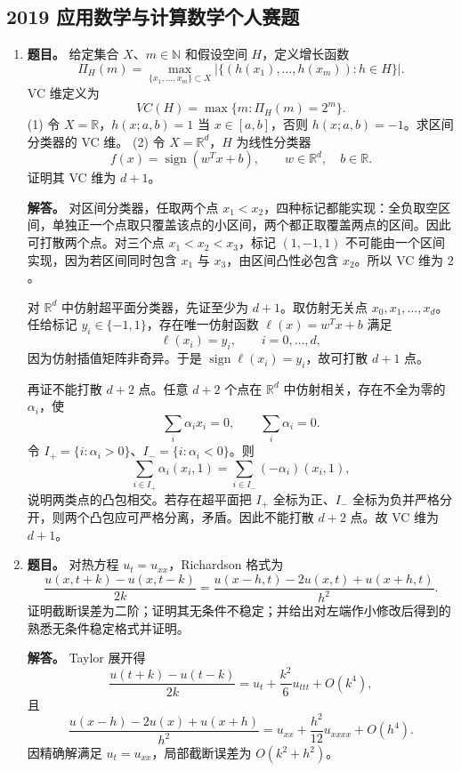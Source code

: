 ﻿\documentclass[UTF8,12pt]{ctexart}
\begin{document}
\subsection{2019 应用数学与计算数学个人赛题}
\begin{enumerate}[label=\textbf{\arabic*.},leftmargin=2.2em]
\item \textbf{题目。} 给定集合 \(X\)、\(m\in\mathbb N\) 和假设空间 \(H\)，定义增长函数
\[
\Pi_H(m)=\max_{\{x_1,
\ldots,x_m\}\subset X}
\left|\{(h(x_1),\ldots,h(x_m)):h\in H\}\right|.
\]
VC 维定义为
\[
VC(H)=\max\{m:\Pi_H(m)=2^m\}.
\]
(1) 令 \(X=\mathbb R\)，\(h(x;a,b)=1\) 当 \(x\in[a,b]\)，否则 \(h(x;a,b)=-1\)。求区间分类器的 VC 维。
(2) 令 \(X=\mathbb R^d\)，\(H\) 为线性分类器
\[
f(x)=\operatorname{sign}(w^Tx+b),
\qquad w\in\mathbb R^d,
\quad b\in\mathbb R.
\]
证明其 VC 维为 \(d+1\)。

\textbf{解答。} 对区间分类器，任取两个点 \(x_1<x_2\)，四种标记都能实现：全负取空区间，单独正一个点取只覆盖该点的小区间，两个都正取覆盖两点的区间。因此可打散两个点。对三个点 \(x_1<x_2<x_3\)，标记 \((1,-1,1)\) 不可能由一个区间实现，因为若区间同时包含 \(x_1\) 与 \(x_3\)，由区间凸性必包含 \(x_2\)。所以 VC 维为 \(2\)。

对 \(\mathbb R^d\) 中仿射超平面分类器，先证至少为 \(d+1\)。取仿射无关点 \(x_0,x_1,
\ldots,x_d\)。任给标记 \(y_i\in\{-1,1\}\)，存在唯一仿射函数 \(\ell(x)=w^Tx+b\) 满足
\[
\ell(x_i)=y_i,
\qquad i=0,
\ldots,d,
\]
因为仿射插值矩阵非奇异。于是 \(\operatorname{sign}\ell(x_i)=y_i\)，故可打散 \(d+1\) 点。

再证不能打散 \(d+2\) 点。任意 \(d+2\) 个点在 \(\mathbb R^d\) 中仿射相关，存在不全为零的 \(\alpha_i\)，使
\[
\sum_i\alpha_i x_i=0,
\qquad
\sum_i\alpha_i=0.
\]
令 \(I_+=\{i:\alpha_i>0\}\)、\(I_-=
\{i:\alpha_i<0\}\)。则
\[
\sum_{i\in I_+}\alpha_i(x_i,1)=
\sum_{i\in I_-}(-\alpha_i)(x_i,1),
\]
说明两类点的凸包相交。若存在超平面把 \(I_+\) 全标为正、\(I_-\) 全标为负并严格分开，则两个凸包应可严格分离，矛盾。因此不能打散 \(d+2\) 点。故 VC 维为 \(d+1\)。

\item \textbf{题目。} 对热方程 \(u_t=u_{xx}\)，Richardson 格式为
\[
\frac{u(x,t+k)-u(x,t-k)}{2k}
=\frac{u(x-h,t)-2u(x,t)+u(x+h,t)}{h^2}.
\]
证明截断误差为二阶；证明其无条件不稳定；并给出对左端作小修改后得到的熟悉无条件稳定格式并证明。

\textbf{解答。} Taylor 展开得
\[
\frac{u(t+k)-u(t-k)}{2k}=u_t+\frac{k^2}{6}u_{ttt}+O(k^4),
\]
且
\[
\frac{u(x-h)-2u(x)+u(x+h)}{h^2}=u_{xx}+\frac{h^2}{12}u_{xxxx}+O(h^4).
\]
因精确解满足 \(u_t=u_{xx}\)，局部截断误差为 \(O(k^2+h^2)\)。


\end{enumerate}
\end{document}
